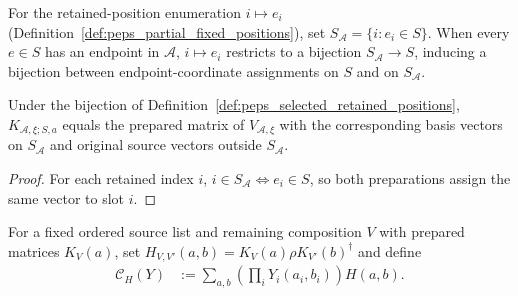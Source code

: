 \begin{definition}
    \label{def:peps_selected_retained_positions}
    \leanok
    For the retained-position enumeration $i\mapsto e_i$
    (Definition~\ref{def:peps_partial_fixed_positions}), set
    $S_{\mathcal A}=\{i:e_i\in S\}$. When every $e\in S$ has an endpoint in
    $\mathcal A$, $i\mapsto e_i$ restricts to a bijection
    $S_{\mathcal A}\to S$, inducing a bijection between endpoint-coordinate
    assignments on $S$ and on $S_{\mathcal A}$.
\end{definition}
\begin{lemma}
    \label{thm:peps_selected_retained_coordinates}
    \leanok
    Under the bijection of Definition~\ref{def:peps_selected_retained_positions},
    $K_{\mathcal A,\xi;S,a}$ equals the prepared matrix of $V_{\mathcal A,\xi}$
    with the corresponding basis vectors on $S_{\mathcal A}$ and original source
    vectors outside $S_{\mathcal A}$.
\end{lemma}
\begin{proof}
    \leanok
    For each retained index $i$, $i\in S_{\mathcal A}\iff e_i\in S$, so both
    preparations assign the same vector to slot $i$.
\end{proof}

For a fixed ordered source list and remaining composition $V$ with prepared
matrices $K_V(a)$, set $H_{V,V'}(a,b)=K_V(a)\rho K_{V'}(b)^\dagger$ and define
\begin{align}
    \mathcal C_H(Y)
     & :=\sum_{a,b}\left(\prod_iY_i(a_i,b_i)\right)H(a,b).
    \label{eq:peps_source_contraction}
\end{align}

